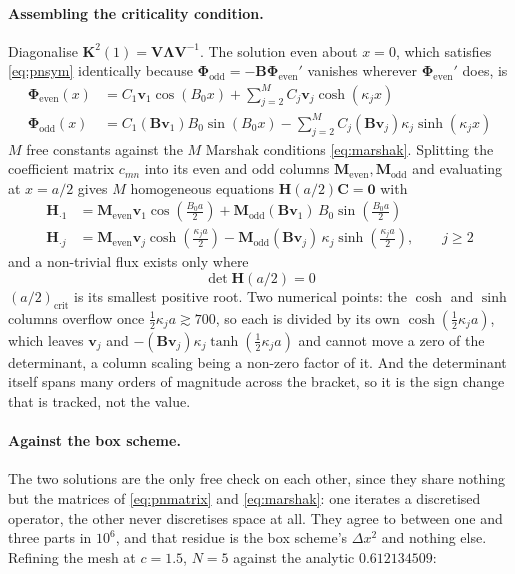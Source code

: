 {\paragraph{Assembling the criticality condition.} Diagonalise
$\mathbf{K}^2(1)=\mathbf{V}\mathbf{\Lambda}\mathbf{V}^{-1}$. The solution even about $x=0$,
which satisfies \eqref{eq:pnsym} identically because
$\boldsymbol{\Phi}_{\text{odd}}=-\mathbf{B}\boldsymbol{\Phi}_{\text{even}}'$ vanishes wherever
$\boldsymbol{\Phi}_{\text{even}}'$ does, is
\begin{align}
    \boldsymbol{\Phi}_{\text{even}}(x) &= C_1\mathbf{v}_1\cos(B_0x)
        + \sum_{j=2}^{M} C_j\mathbf{v}_j\cosh(\kappa_jx) \\
    \boldsymbol{\Phi}_{\text{odd}}(x) &= C_1(\mathbf{B}\mathbf{v}_1)B_0\sin(B_0x)
        - \sum_{j=2}^{M} C_j(\mathbf{B}\mathbf{v}_j)\kappa_j\sinh(\kappa_jx)
\end{align}
$M$ free constants against the $M$ Marshak conditions \eqref{eq:marshak}. Splitting the
coefficient matrix $c_{mn}$ into its even and odd columns
$\mathbf{M}_{\text{even}},\mathbf{M}_{\text{odd}}$ and evaluating at $x=a/2$ gives $M$ homogeneous
equations $\mathbf{H}(a/2)\mathbf{C}=\mathbf{0}$ with
\begin{align*}
    \mathbf{H}_{\cdot1} &= \mathbf{M}_{\text{even}}\mathbf{v}_1\cos\!\left(\tfrac{B_0a}{2}\right)
        +\mathbf{M}_{\text{odd}}(\mathbf{B}\mathbf{v}_1)\,B_0\sin\!\left(\tfrac{B_0a}{2}\right) \\
    \mathbf{H}_{\cdot j} &= \mathbf{M}_{\text{even}}\mathbf{v}_j\cosh\!\left(\tfrac{\kappa_ja}{2}\right)
        -\mathbf{M}_{\text{odd}}(\mathbf{B}\mathbf{v}_j)\,\kappa_j\sinh\!\left(\tfrac{\kappa_ja}{2}\right),
        \qquad j\ge2
\end{align*}
and a non-trivial flux exists only where
\begin{equation}
    \boxed{\;\det\mathbf{H}(a/2)=0\;}
    \label{eq:hdet}
\end{equation}
$(a/2)_{\text{crit}}$ is its smallest positive root. Two numerical points: the $\cosh$ and $\sinh$
columns overflow once $\tfrac12\kappa_ja\gtrsim700$, so each is divided by its own $\cosh(\tfrac12\kappa_ja)$,
which leaves $\mathbf{v}_j$ and $-(\mathbf{B}\mathbf{v}_j)\kappa_j\tanh(\tfrac12\kappa_ja)$ and cannot
move a zero of the determinant, a column scaling being a non-zero factor of it. And the
determinant itself spans many orders of magnitude across the bracket, so it is the sign change
that is tracked, not the value.


\paragraph{Against the box scheme.} The two solutions are the only free check on each other,
since they share nothing but the matrices of \eqref{eq:pnmatrix} and
\eqref{eq:marshak}: one iterates a discretised operator, the other never discretises space at
all. They agree to between one and three parts in $10^{6}$, and that residue is the box scheme's
$\Delta x^2$ and nothing else. Refining the mesh at $c=1.5$, $N=5$ against the analytic
$0.612134509$:

}

